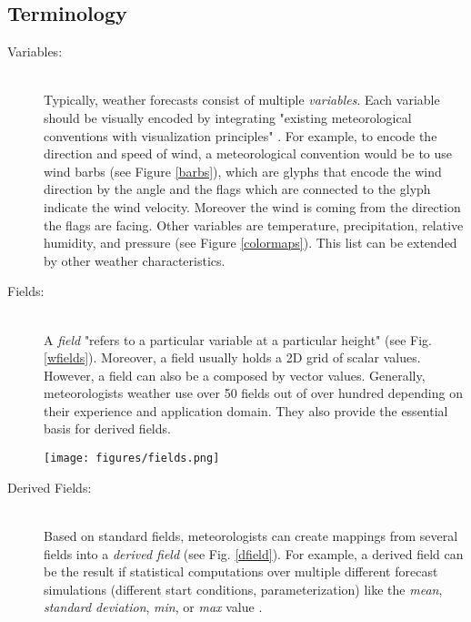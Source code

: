 \documentclass[citeauthoryear]{llncs}
\begin{document}
\subsection{Terminology}
\begin{description}
\item[Variables:] \ \\
Typically, weather forecasts consist of multiple \textit{variables}. Each variable should be visually encoded by integrating "existing meteorological conventions with visualization principles" \cite{quinan2016visually}. For example, to encode the direction and speed of wind, a meteorological convention would be to use wind barbs (see Figure \ref{barbs}), which are glyphs that encode the wind direction by the angle and the flags which are connected to the glyph indicate the wind velocity. Moreover the wind is coming from the direction the flags are facing. 
Other variables are temperature, precipitation, relative humidity, and pressure (see Figure \ref{colormaps}). This list can be extended by other weather characteristics.  \\
\item[Fields:] \ \\
A \textit{field} "refers to a particular variable at a particular height"\cite{quinan2016visually} (see Fig. \ref{wfields}). Moreover, a field usually holds a 2D grid of scalar values. However, a field can also be a composed by vector values. Generally, meteorologists weather use over 50 fields out of over hundred depending on their experience and application domain. They also provide the essential basis for derived fields.
\vspace*{-0.5cm}
\begin{SCfigure}
	\centering
	\texttt{[image: figures/fields.png]}
	\caption{Weather fields can be visualized using independent layers for each field. In this example, temperature is encoded using the color map mentioned above. Another layer contains wind information encoded by wind barbs and displayed using a equidistant 2D grid of corresponding glyphs. Isocontours indiciate the location of same pressure levels of the atmosphere \cite{quinan2016visually}.}
	\label{wfields}
\end{SCfigure}
\item[Derived Fields:] \ \\
Based on standard fields, meteorologists can create mappings from several fields into a \textit{derived field} (see Fig. \ref{dfield}). For example, a derived field can be the result if statistical computations over multiple different forecast simulations (different start conditions, parameterization) like the \textit{mean}, \textit{standard deviation}, \textit{min}, or \textit{max} value \cite{quinan2016visually}.

\end{description}
\end{document}

